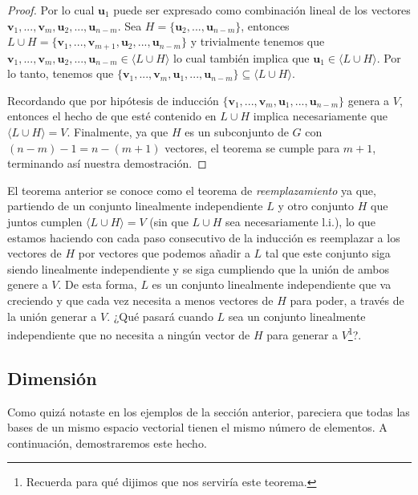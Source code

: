 \documentclass[12pt]{article}
\newenvironment{teorema}[2][Teorema]{\begin{trivlist}
\item[\hskip \labelsep {\bfseries #1}\hskip \labelsep {\bfseries #2.}]}{\end{trivlist}}
\begin{document}
\begin{teorema} {4.1.1}
\begin{proof}
    Por lo cual $\mathbf{u}_1$ puede ser expresado como combinación lineal de los vectores $\mathbf{v}_1,...,\mathbf{v}_m,\mathbf{u}_2,...,\mathbf{u}_{n-m}.$ Sea $H=\{\mathbf{u}_2,...,\mathbf{u}_{n-m}\}$, entonces $L\cup H=\{\mathbf{v}_1,...,\mathbf{v}_{m+1},\mathbf{u}_2,...,\mathbf{u}_{n-m}\}$ y trivialmente tenemos que $\mathbf{v}_1,...,\mathbf{v}_m,\mathbf{u}_2,...,\mathbf{u}_{n-m}\in\langle L\cup H\rangle$ \textemdash lo cual también implica que $\mathbf{u}_1\in\langle L\cup H\rangle$. Por lo tanto, tenemos que $\{\mathbf{v}_1,...,\mathbf{v}_m,\mathbf{u}_1,...,\mathbf{u}_{n-m}\}\subseteq\langle L\cup H\rangle.$

    Recordando que por hipótesis de inducción $\{\mathbf{v}_1,...,\mathbf{v}_m,\mathbf{u}_1,...,\mathbf{u}_{n-m}\}$ genera a $V$, entonces el hecho de que esté contenido en $L\cup H$ implica necesariamente que $\langle L\cup H\rangle=V.$ Finalmente, ya que $H$ es un subconjunto de $G$ con $(n-m)-1=n-(m+1)$ vectores, el teorema se cumple para $m+1$, terminando así nuestra demostración.

    \end{proof}
\end{teorema}

El teorema anterior se conoce como el teorema de \emph{reemplazamiento} ya que, partiendo de un conjunto linealmente independiente $L$ y otro conjunto $H$ que juntos cumplen $\langle L\cup H \rangle=V$ (sin que $L\cup H$ sea necesariamente l.i.), lo que estamos haciendo con cada paso consecutivo de la inducción es reemplazar a los vectores de $H$ por vectores que podemos añadir a $L$ tal que este conjunto siga siendo linealmente independiente y se siga cumpliendo que la unión de ambos genere a $V$. De esta forma, $L$ es un conjunto linealmente independiente que va creciendo y que cada vez necesita a menos vectores de $H$ para poder, a través de la unión generar a $V$. ¿Qué pasará cuando $L$ sea un conjunto linealmente independiente que no necesita a ningún vector de $H$ para generar a $V$\footnote{Recuerda para qué dijimos que nos serviría este teorema.}?. 

\subsection{Dimensión} \label{Subsec:Dimensión}

Como quizá notaste en los ejemplos de la sección anterior, pareciera que todas las bases de un mismo espacio vectorial tienen el mismo número de elementos. A continuación, demostraremos este hecho.
\end{document}
